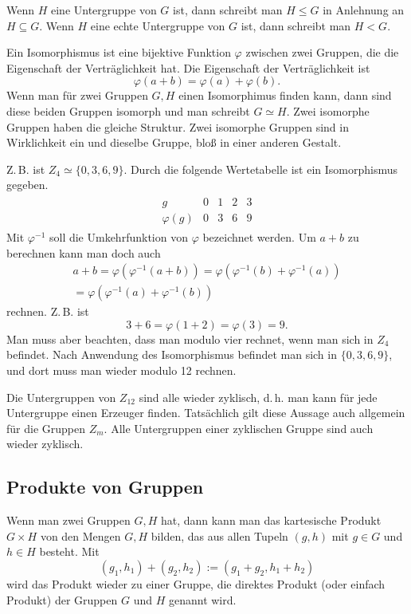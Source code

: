 \documentclass[a4paper,11pt,fleqn,twocolumn,twoside,dvipdfmx]{scrartcl}
\begin{document}
Wenn $H$ eine Untergruppe von $G$ ist, dann schreibt man $H\le G$ in
Anlehnung an $H\subseteq G$. Wenn $H$ eine echte Untergruppe von $G$
ist, dann schreibt man $H<G$.

Ein Isomorphismus ist eine bijektive Funktion $\varphi$ zwischen zwei
Gruppen, die die Eigenschaft der Verträglichkeit hat. Die Eigenschaft
der Verträglichkeit ist%
\[\varphi(a+b) = \varphi(a)+\varphi(b).\]
%
Wenn man für zwei Gruppen $G,H$ einen Isomorphimus finden kann, dann
sind diese beiden Gruppen isomorph und man schreibt $G\simeq H$.
Zwei isomorphe Gruppen haben die gleiche Struktur. Zwei isomorphe
Gruppen sind in Wirklichkeit ein und dieselbe Gruppe, bloß in einer
anderen Gestalt. 

Z.\,B. ist $Z_4\simeq \{0,3,6,9\}$. Durch die folgende Wertetabelle
ist ein Isomorphismus gegeben.%
\begin{gather*}
\begin{array}{c|c|c|c|c}
g & 0 & 1 & 2 & 3\\
\hline
\varphi(g) & 0 & 3 & 6 & 9
\end{array}
\end{gather*}
%
Mit $\varphi^{-1}$ soll die Umkehrfunktion von $\varphi$ bezeichnet
werden. Um $a+b$ zu berechnen kann man doch auch%
\begin{gather*}
a+b = \varphi(\varphi^{-1}(a+b)) = \varphi(\varphi^{-1}(b)+\varphi^{-1}(a))\\
= \varphi(\varphi^{-1}(a)+\varphi^{-1}(b))
\end{gather*}
rechnen. Z.\,B. ist
\[3+6 = \varphi(1+2) = \varphi(3) = 9.\]
Man muss aber beachten, dass man modulo vier rechnet, wenn man sich
in $Z_4$ befindet. Nach Anwendung des Isomorphismus befindet man sich
in $\{0,3,6,9\}$, und dort muss man wieder modulo 12 rechnen.

Die Untergruppen von $Z_{12}$ sind alle wieder zyklisch, d.\,h. man
kann für jede Untergruppe einen Erzeuger finden. Tatsächlich gilt
diese Aussage auch allgemein für die Gruppen $Z_m$. Alle Untergruppen
einer zyklischen Gruppe sind auch wieder zyklisch.


\subsection{Produkte von Gruppen}

Wenn man zwei Gruppen $G, H$ hat, dann kann man das kartesische
Produkt $G\times H$ von den Mengen $G,H$ bilden, das aus allen
Tupeln $(g,h)$ mit $g\in G$ und $h\in H$ besteht. Mit
\[(g_1,h_1)+(g_2,h_2) := (g_1+g_2,h_1+h_2)\]
wird das Produkt wieder zu einer Gruppe, die direktes Produkt
(oder einfach Produkt) der Gruppen $G$ und $H$ genannt wird.
\end{document}
